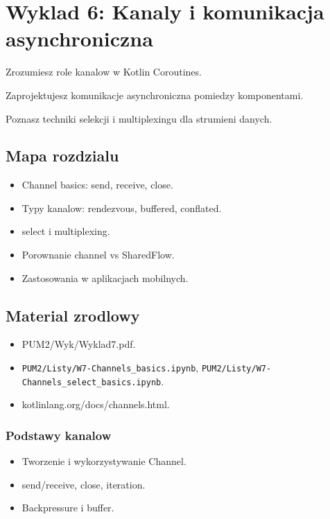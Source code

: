 \chapter{Wyklad 6: Kanaly i komunikacja asynchroniczna}

\begin{learningobjectives}
  \item Zrozumiesz role kanalow w Kotlin Coroutines.
  \item Zaprojektujesz komunikacje asynchroniczna pomiedzy komponentami.
  \item Poznasz techniki selekcji i multiplexingu dla strumieni danych.
\end{learningobjectives}

\section{Mapa rozdzialu}
\begin{itemize}
  \item Channel basics: send, receive, close.
  \item Typy kanalow: rendezvous, buffered, conflated.
  \item select i multiplexing.
  \item Porownanie channel vs SharedFlow.
  \item Zastosowania w aplikacjach mobilnych.
\end{itemize}

\section{Material zrodlowy}
\begin{itemize}
  \item PUM2/Wyk/Wyklad7.pdf.
  \item \texttt{PUM2/Listy/W7-Channels\_basics.ipynb}, \texttt{PUM2/Listy/W7-Channels\_select\_basics.ipynb}.
  \item kotlinlang.org/docs/channels.html.
\end{itemize}

\subsection{Podstawy kanalow}
\begin{itemize}
  \item Tworzenie i wykorzystywanie Channel.
  \item send/receive, close, iteration.
  \item Backpressure i buffer.
\end{itemize}

